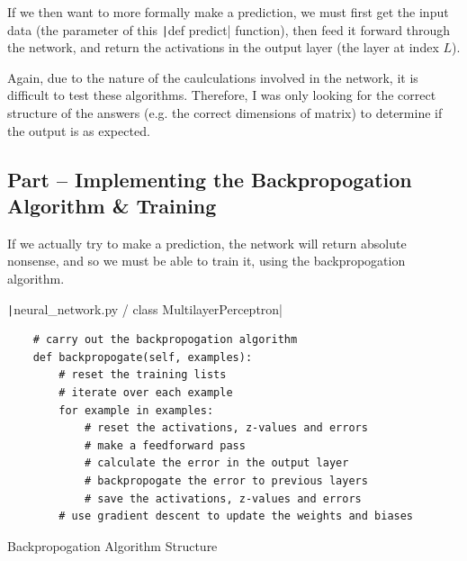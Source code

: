 \documentclass[12pt]{report}
\newcommand{\pil}[1]{\protect\texttt|#1|}
\begin{document}
If we then want to more formally make a prediction, we must first get the input data (the parameter of this \pil{def predict} function), then feed it forward through the network, and return the activations in the output layer (the layer at index $L$).

\begin{center}
\end{center}

Again, due to the nature of the caulculations involved in the network, it is difficult to test these algorithms. Therefore, I was only looking for the correct structure of the answers (e.g. the correct dimensions of matrix) to determine if the output is as expected.

\subsection{Part \theparts{} -- Implementing the Backpropogation Algorithm \& Training}

If we actually try to make a prediction, the network will return absolute nonsense, and so we must be able to train it, using the backpropogation algorithm.

\begin{listing}[H]
\pil{neural_network.py / class MultilayerPerceptron}
\begin{verbatim}
    # carry out the backpropogation algorithm
    def backpropogate(self, examples):
        # reset the training lists
        # iterate over each example
        for example in examples:
            # reset the activations, z-values and errors
            # make a feedforward pass
            # calculate the error in the output layer
            # backpropogate the error to previous layers
            # save the activations, z-values and errors
        # use gradient descent to update the weights and biases
\end{verbatim}
\caption{Backpropogation Algorithm Structure}\label{cs:backpropogationShell}
\end{listing}
\end{document}
